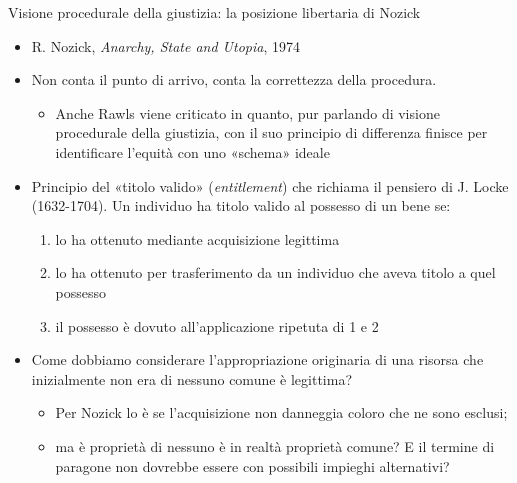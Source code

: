 \documentclass[11pt]{beamer}
\begin{document}
\begin{frame}{Visione procedurale della giustizia: la posizione libertaria di Nozick}
\begin{itemize}
\item R. Nozick, \emph{Anarchy, State and Utopia}, 1974
\item Non conta il punto di arrivo, conta la correttezza della procedura.
\begin{itemize}
\item Anche Rawls viene criticato in quanto, pur parlando di visione procedurale
della giustizia, con il suo principio di differenza finisce per
identificare l'equità con uno «schema» ideale
\end{itemize}
\item Principio del «titolo valido» (\emph{entitlement}) che richiama il pensiero di
J. Locke (1632-1704). Un individuo ha titolo valido al possesso di un bene
se:
\begin{enumerate}
\item lo ha ottenuto mediante acquisizione legittima
\item lo ha ottenuto per trasferimento da un individuo che aveva titolo a
quel possesso
\item il possesso è dovuto all'applicazione ripetuta di 1 e 2
\end{enumerate}
\item Come dobbiamo considerare l'appropriazione originaria di una risorsa che
inizialmente non era di nessuno comune è legittima?
\begin{itemize}
\item Per Nozick lo è se l'acquisizione non danneggia coloro che ne sono
esclusi;
\item ma è proprietà di nessuno è in realtà proprietà comune? E il termine di
paragone non dovrebbe essere con possibili impieghi alternativi?
\end{itemize}
\end{itemize}
\end{frame}
\end{document}
